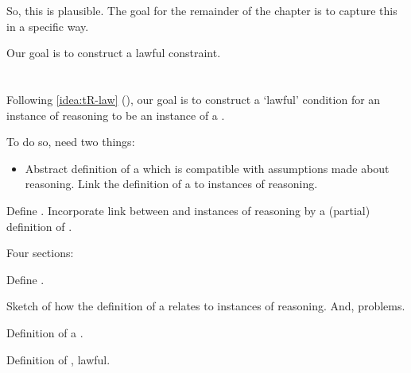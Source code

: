 \begin{note}
  So, this is plausible.
  The goal for the remainder of the chapter is to capture this in a specific way.

  Our goal is to construct a lawful constraint.
\end{note}

\section{}
\label{cha:typical:sec:tR}


\begin{note}
  Following \autoref{idea:tR-law} (), our goal is to construct a `lawful' condition for an instance of reasoning to be an instance of a \torN{}.

  To do so, need two things:

  \begin{itemize}
  \item
    Abstract definition of a \tor{} which is compatible with assumptions made about reasoning.
    Link the definition of a \tor{} to instances of reasoning.
  \end{itemize}

  Define \tor{}.
  Incorporate link between \torN{} and instances of reasoning by a (partial) definition of \tRN{}.
\end{note}

\begin{note}
  Four sections:

  \begin{TOCEnum}
  \item

    Define \tor{}.
  \item

    Sketch of how the definition of a \tor{} relates to instances of reasoning.
    And, problems.
  \item

    Definition of a \rotorN{}.
  \item

    Definition of \tR{}, lawful.
  \end{TOCEnum}
\end{note}


